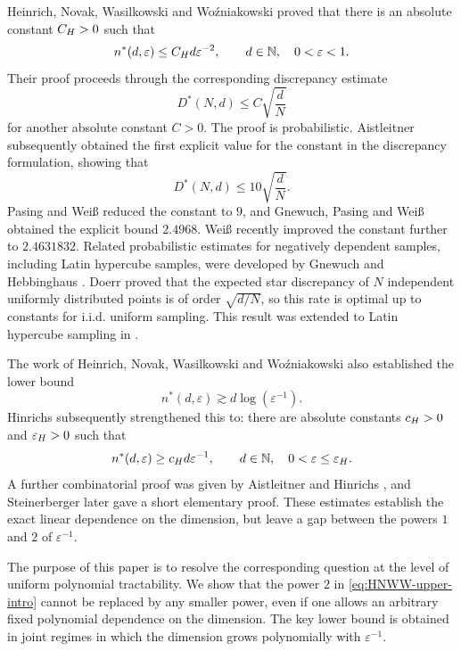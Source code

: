 \documentclass[10pt,a4paper]{amsart}
\newcommand{\1}{\mathbf{1}}
\newcommand{\N}{\mathbb{N}}
\begin{document}
Heinrich, Novak, Wasilkowski and Wo\'{z}niakowski \cite{HNWW01} proved that there is an absolute constant \(C_{\rm H}>0\) such that
\begin{equation}\label{eq:HNWW-upper-intro}
 n^{\ast}(d,\varepsilon)
 \le C_{\rm H}d\varepsilon^{-2},
 \qquad d\in\N,\quad 0<\varepsilon<1.
\end{equation}
Their proof proceeds through the corresponding discrepancy estimate
\[
 D^\ast(N,d)\le C\sqrt{\frac dN}
\]
for another absolute constant \(C>0\). The proof is probabilistic.  Aistleitner \cite{Ais11} subsequently obtained the first explicit value for the constant in the discrepancy formulation, showing that
\[
 D^{\ast}(N,d)\le 10\sqrt{\frac dN}.
\]
Pasing and Wei\ss{} \cite{PW20} reduced the constant to \(9\), and Gnewuch, Pasing and Wei\ss{} \cite{GPW21} obtained the explicit bound \(2.4968\). Wei\ss{} \cite{W26} recently improved the constant further to $2.4631832$.  Related probabilistic estimates for negatively dependent samples, including Latin hypercube samples, were developed by Gnewuch and Hebbinghaus \cite{GH21}.  Doerr \cite{Doe14} proved that the expected star discrepancy of \(N\) independent uniformly distributed points is of order \(\sqrt{d/N}\), so this rate is optimal up to constants for i.i.d. uniform sampling. This result was extended to Latin hypercube sampling in \cite{DDG18}.

The work of Heinrich, Novak, Wasilkowski and Wo\'{z}niakowski \cite{HNWW01} also established the lower bound
\[
 n^{\ast}(d,\varepsilon)\gtrsim d\log(\varepsilon^{-1}).
\]
Hinrichs \cite{H04} subsequently strengthened this to: there are absolute constants \(c_{\rm H}>0\) and \(\varepsilon_{\rm H}>0\) such that
\begin{equation}\label{eq:Hinrichs-lower-intro}
 n^{\ast}(d,\varepsilon)
 \ge c_{\rm H}d\varepsilon^{-1},
 \qquad d\in\N,\quad 0<\varepsilon\le\varepsilon_{\rm H}.
\end{equation}
A further combinatorial proof was given by Aistleitner and Hinrichs \cite{AH18}, and Steinerberger \cite{S23} later gave a short elementary proof.  These estimates establish the exact linear dependence on the dimension, but leave a gap between the powers \(1\) and \(2\) of \(\varepsilon^{-1}\).



The purpose of this paper is to resolve the corresponding question at the level of uniform polynomial tractability.  We show that the power \(2\) in \eqref{eq:HNWW-upper-intro} cannot be replaced by any smaller power, even if one allows an arbitrary fixed polynomial dependence on the dimension.  The key lower bound is obtained in joint regimes in which the dimension grows polynomially with \(\varepsilon^{-1}\).
\end{document}
